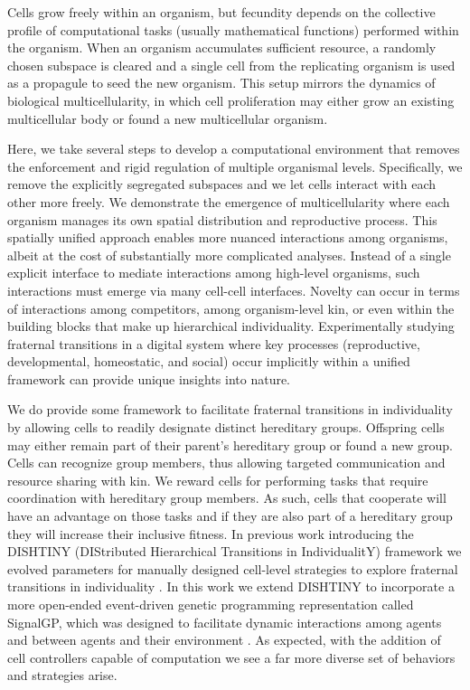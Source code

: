 Cells grow freely within an organism, but fecundity depends on the collective profile of computational tasks (usually mathematical functions) performed within the organism.
When an organism accumulates sufficient resource, a randomly chosen subspace is cleared and a single cell from the replicating organism is used as a propagule to seed the new organism.
This setup mirrors the dynamics of biological multicellularity, in which cell proliferation may either grow an existing multicellular body or found a new multicellular organism.

Here, we take several steps to develop a computational environment that removes the enforcement and rigid regulation of multiple organismal levels.
Specifically, we remove the explicitly segregated subspaces and we let cells interact with each other more freely.
We demonstrate the emergence of multicellularity where each organism manages its own spatial distribution and reproductive process.
This spatially unified approach enables more nuanced interactions among organisms, albeit at the cost of substantially more complicated analyses.
Instead of a single explicit interface to mediate interactions among high-level organisms, such interactions must emerge via many cell-cell interfaces.
Novelty can occur in terms of interactions among competitors, among organism-level kin, or even within the building blocks that make up hierarchical individuality.
Experimentally studying fraternal transitions in a digital system where key processes (reproductive, developmental, homeostatic, and social) occur implicitly within a unified framework can provide unique insights into nature.

We do provide some framework to facilitate fraternal transitions in individuality by allowing cells to readily designate distinct hereditary groups.
Offspring cells may either remain part of their parent's hereditary group or found a new group.
Cells can recognize group members, thus allowing targeted communication and resource sharing with kin.
We reward cells for performing tasks that require coordination with hereditary group members.
As such, cells that cooperate will have an advantage on those tasks and if they are also part of a hereditary group they will increase their inclusive fitness.
In previous work introducing the DISHTINY (DIStributed Hierarchical Transitions in IndividualitY) framework we evolved parameters for manually designed cell-level strategies to explore fraternal transitions in individuality \citep{moreno2019toward}.
In this work we extend DISHTINY to incorporate a more open-ended event-driven genetic programming representation called SignalGP, which was designed to facilitate dynamic interactions among agents and between agents and their environment \citep{lalejini2018evolving}.
As expected, with the addition of cell controllers capable of computation we see a far more diverse set of behaviors and strategies arise.

